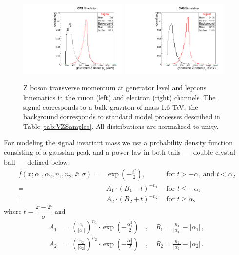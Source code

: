 \begin{figure}[p]
\includegraphics[width=0.48\textwidth]{figures/objects/genZptMNP.pdf}
\includegraphics[width=0.48\textwidth]{figures/objects/genZptENP.pdf}
\caption[Signal characterization]{Z boson transverse momentum at generator level and leptons kinematics in the muon (left) and electron (right) channels. The signal corresponds to a bulk graviton of mass 1.6 TeV; the background corresponds to standard model processes described in Table \ref{tab:VZSamples}. All distributions are normalized to unity.}
\label{fig:signalid}
\end{figure}

For modeling the signal invariant mass we use a probability density function consisting of a gaussian peak and a power-law in both tails ---~double crystal ball~--- defined below:
\begin{eqnarray*}
f(x;\alpha_1,\alpha_2,n_1,n_2,\bar x,\sigma) =& \exp(- \frac{t^2}{2}), & \mbox{for } t > -\alpha_1 \mbox{  and  } t<\alpha_2 \\
=& A_1 \cdot (B_1 - t)^{-n_1}, & \mbox{for } t \leq -\alpha_1 \\
=& A_2 \cdot (B_2 + t)^{-n_2}, & \mbox{for } t \geq \alpha_2
\end{eqnarray*}
where $t = \dfrac{x - \bar x}{\sigma}$ and
\begin{eqnarray*}
A_1 &= \left(\frac{n_1}{\left| \alpha_1 \right|}\right)^{n_1} \cdot \exp\left(- \frac {\alpha_1 ^2}{2}\right) \quad , \quad
B_1 = \frac{n_1}{\left| \alpha_1 \right|}  - \left| \alpha_1 \right|\,,\\
A_2 &= \left(\frac{n_2}{\left| \alpha_2 \right|}\right)^{n_2} \cdot \exp\left(- \frac {\alpha_2 ^2}{2}\right) \quad , \quad
B_2 = \frac{n_2}{\left| \alpha_2 \right|}  - \left| \alpha_2 \right|\,.
\end{eqnarray*}

